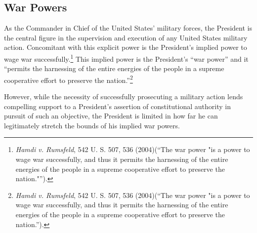 \subsection{War Powers}
As the Commander in Chief of the United States' military forces, the President is the central figure in the supervision and execution of any United States military action.   Concomitant with this explicit power is the President's implied power to wage war successfully.\footnote{\textit{Hamdi v. Rumsfeld}, 542 U. S. 507, 536 (2004)(``The war power "is a power to wage war successfully, and thus it permits the harnessing of the entire energies of the people in a supreme cooperative effort to preserve the nation."'').}
This implied power is the President's ``war power'' and it ``permits the harnessing of the entire energies of the people in a supreme cooperative effort to preserve the nation.''\footnote{\textit{Hamdi v. Rumsfeld}, 542 U. S. 507, 536 (2004)(``The war power "is a power to wage war successfully, and thus it permits the harnessing of the entire energies of the people in a supreme cooperative effort to preserve the nation.'').}

However, while the necessity of successfully prosecuting a military action lends compelling support to a President's assertion of constitutional authority in pursuit of such an objective, the President is limited in how far he can legitimately stretch the bounds of his implied war powers.

